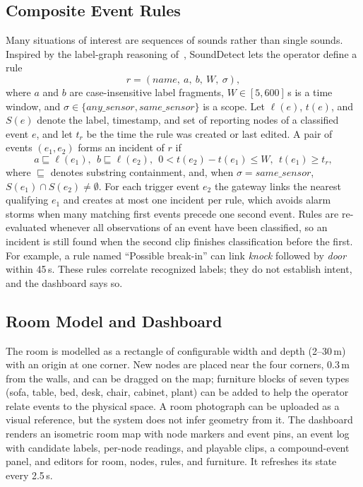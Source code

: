 \documentclass[conference]{IEEEtran}
\begin{document}
\subsection{Composite Event Rules}
Many situations of interest are sequences of sounds rather than single sounds. Inspired by the label-graph reasoning of~\cite{saradopoulos2025}, SoundDetect lets the operator define a rule
\begin{equation}
r = (\textit{name},\ a,\ b,\ W,\ \sigma),
\end{equation}
where $a$ and $b$ are case-insensitive label fragments, $W \in [5, 600]$\,s is a time window, and $\sigma \in \{\textit{any\_sensor}, \textit{same\_sensor}\}$ is a scope. Let $\ell(e)$, $t(e)$, and $S(e)$ denote the label, timestamp, and set of reporting nodes of a classified event $e$, and let $t_r$ be the time the rule was created or last edited. A pair of events $(e_1, e_2)$ forms an incident of $r$ if
\begin{equation}
a \sqsubseteq \ell(e_1),\ \ b \sqsubseteq \ell(e_2),\ \ 0 < t(e_2) - t(e_1) \leq W,\ \ t(e_1) \geq t_r,
\end{equation}
where $\sqsubseteq$ denotes substring containment, and, when $\sigma = \textit{same\_sensor}$, $S(e_1) \cap S(e_2) \neq \emptyset$. For each trigger event $e_2$ the gateway links the nearest qualifying $e_1$ and creates at most one incident per rule, which avoids alarm storms when many matching first events precede one second event. Rules are re-evaluated whenever all observations of an event have been classified, so an incident is still found when the second clip finishes classification before the first. For example, a rule named ``Possible break-in'' can link \emph{knock} followed by \emph{door} within 45\,s. These rules correlate recognized labels; they do not establish intent, and the dashboard says so.

\subsection{Room Model and Dashboard}
The room is modelled as a rectangle of configurable width and depth (2--30\,m) with an origin at one corner. New nodes are placed near the four corners, 0.3\,m from the walls, and can be dragged on the map; furniture blocks of seven types (sofa, table, bed, desk, chair, cabinet, plant) can be added to help the operator relate events to the physical space. A room photograph can be uploaded as a visual reference, but the system does not infer geometry from it. The dashboard renders an isometric room map with node markers and event pins, an event log with candidate labels, per-node readings, and playable clips, a compound-event panel, and editors for room, nodes, rules, and furniture. It refreshes its state every 2.5\,s.
\end{document}
